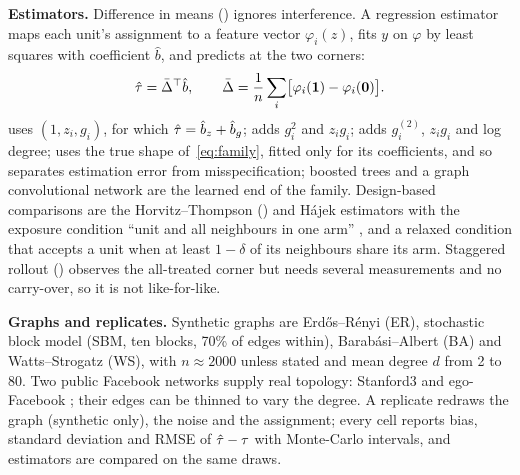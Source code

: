 \textbf{Estimators.}
Difference in means () ignores interference.
A regression estimator maps each unit's assignment to a feature vector $\varphi_i(z)$, fits $y$ on $\varphi$ by least squares with coefficient $\hat b$, and predicts at the two corners:
\begin{equation}
\hat\tau=\bar\Delta^{\top}\hat b,\qquad \bar\Delta=\frac1n\sum_i\bigl[\varphi_i(\mathbf 1)-\varphi_i(\mathbf 0)\bigr].\label{eq:reg}
\end{equation}
 uses $(1,z_i,g_i)$, for which $\hat\tau=\hat b_z+\hat b_g$;  adds $g_i^2$ and $z_ig_i$;  adds $g_i^{(2)}$, $z_ig_i$ and log degree;  uses the true shape of~\eqref{eq:family}, fitted only for its coefficients, and so separates estimation error from misspecification; boosted trees and a graph convolutional network are the learned end of the family.
Design-based comparisons are the Horvitz--Thompson () and Hájek estimators with the exposure condition ``unit and all neighbours in one arm'' \citep{aronow2017estimating}, and a relaxed condition that accepts a unit when at least $1-\delta$ of its neighbours share its arm.
Staggered rollout () observes the all-treated corner but needs several measurements and no carry-over, so it is not like-for-like.

\textbf{Graphs and replicates.}
Synthetic graphs are Erd\H{o}s--R\'enyi (ER), stochastic block model (SBM, ten blocks, 70\% of edges within), Barab\'asi--Albert (BA) and Watts--Strogatz (WS), with $n\approx 2000$ unless stated and mean degree $d$ from 2 to 80.
Two public Facebook networks supply real topology: Stanford3 \citep{traud2012social,rossi2015network} and ego-Facebook \citep{mcauley2012learning}; their edges can be thinned to vary the degree.
A replicate redraws the graph (synthetic only), the noise and the assignment; every cell reports bias, standard deviation and RMSE of $\hat\tau-\tau$ with Monte-Carlo intervals, and estimators are compared on the same draws.
